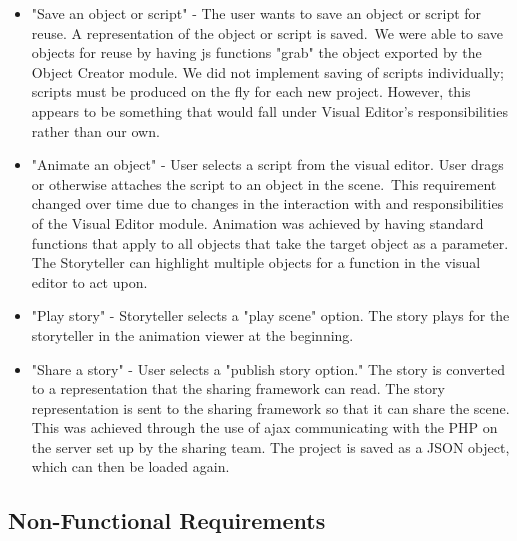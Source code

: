 \documentclass[12pt]{article}
\begin{document}
\begin{itemize}
\item "Save an object or script" - The user wants to save an object or script for reuse. A representation of the object or script is saved.\
We were able to save objects for reuse by having js functions "grab" the object exported by the Object Creator module. We did not implement saving of scripts individually; scripts must be produced on the fly for each new project. However, this appears to be something that would fall under Visual Editor's responsibilities rather than our own.

\item "Animate an object" -  User selects a script from the visual editor. User drags or otherwise attaches the script to an object in the scene.\
This requirement changed over time due to changes in the interaction with and responsibilities of the Visual Editor module. Animation was achieved by having standard functions that apply to all objects that take the target object as a parameter. The Storyteller can highlight multiple objects for a function in the visual editor to act upon.

\item "Play story" - Storyteller selects a "play scene" option. The story plays for the storyteller in the animation viewer at the beginning.\

\item "Share a story" - User selects a "publish story option." The story is converted to a representation that the sharing framework can read. The story representation is sent to the sharing framework so that it can share the scene.
This was achieved through the use of ajax communicating with the PHP on the server set up by the sharing team. The project is saved as a JSON object, which can then be loaded again.
\end{itemize}

\subsection{Non-Functional Requirements}
\end{document}
